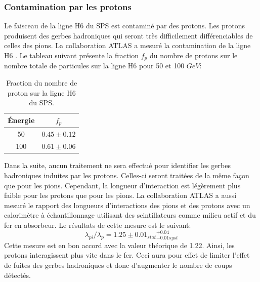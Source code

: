 \subsubsection{Contamination par les protons}
Le faisceau de la ligne H6 du SPS est contaminé par des protons. Les protons produisent des gerbes hadroniques qui seront très difficilement différenciables de celles des pions. La collaboration ATLAS a mesuré la contamination de la ligne H6 \cite{Abat}. Le tableau suivant présente la fraction $f_p$ du nombre de protons sur le nombre totale de particules sur la ligne H6 pour 50 et 100 $GeV$:
\begin{table}[!ht]
  \begin{center}
    \begin{tabular}{c|c}
      Énergie & $f_p$\\
      \hline
      50 & $0.45\pm0.12$\\
      100 & $0.61\pm0.06$\\
    \end{tabular}
  \end{center}  
  \caption{Fraction du nombre de proton sur la ligne H6 du SPS.}
  \label{tab.fp}
\end{table}
Dans la suite, aucun traitement ne sera effectué pour identifier les gerbes hadroniques induites par les protons. Celles-ci seront traitées de la même façon que pour les pions. Cependant, la longueur d’interaction est légèrement plus faible pour les protons que pour les pions. La collaboration ATLAS a aussi mesuré le rapport des longueurs d’interactions des pions et des protons avec un calorimètre à échantillonnage utilisant des scintillateurs comme milieu actif et du fer en absorbeur. Le résultats de cette mesure est le suivant:
\begin{equation}
  \lambda_{pi}/\lambda_{p}=1.25\pm0.01_{stat}{}_{-0.01syst}^{+0.04}
\end{equation}
Cette mesure est en bon accord avec la valeur théorique de 1.22. Ainsi, les protons interagissent plus vite dans le fer. Ceci aura pour effet de limiter l'effet de fuites des gerbes hadroniques et donc d'augmenter le nombre de coups détectés. 
